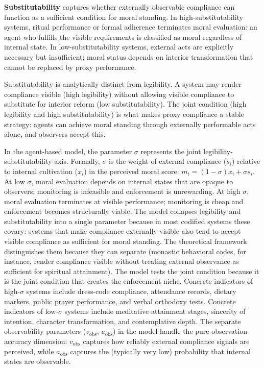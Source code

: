 \documentclass[12pt]{article}
\begin{document}
\textbf{Substitutability} captures whether externally observable compliance can function as a sufficient condition for moral standing. In high-substitutability systems, ritual performance or formal adherence terminates moral evaluation: an agent who fulfills the visible requirements is classified as moral regardless of internal state. In low-substitutability systems, external acts are explicitly necessary but insufficient; moral status depends on interior transformation that cannot be replaced by proxy performance.

Substitutability is analytically distinct from legibility. A system may render compliance visible (high legibility) without allowing visible compliance to substitute for interior reform (low substitutability). The joint condition (high legibility and high substitutability) is what makes proxy compliance a stable strategy: agents can achieve moral standing through externally performable acts alone, and observers accept this.

In the agent-based model, the parameter $\sigma$ represents the joint legibility-substitutability axis. Formally, $\sigma$ is the weight of external compliance ($s_i$) relative to internal cultivation ($x_i$) in the perceived moral score: $m_i = (1 - \sigma)x_i + \sigma s_i$. At low $\sigma$, moral evaluation depends on internal states that are opaque to observers; monitoring is infeasible and enforcement is unrewarding. At high $\sigma$, moral evaluation terminates at visible performance; monitoring is cheap and enforcement becomes structurally viable. The model collapses legibility and substitutability into a single parameter because in most codified systems these covary: systems that make compliance externally visible also tend to accept visible compliance as sufficient for moral standing. The theoretical framework distinguishes them because they can separate (monastic behavioral codes, for instance, render compliance visible without treating external observance as sufficient for spiritual attainment). The model tests the joint condition because it is the joint condition that creates the enforcement niche. Concrete indicators of high-$\sigma$ systems include dress-code compliance, attendance records, dietary markers, public prayer performance, and verbal orthodoxy tests. Concrete indicators of low-$\sigma$ systems include meditative attainment stages, sincerity of intention, character transformation, and contemplative depth. The separate observability parameters ($v_{\text{obs}}$, $a_{\text{obs}}$) in the model handle the pure observation-accuracy dimension: $v_{\text{obs}}$ captures how reliably external compliance signals are perceived, while $a_{\text{obs}}$ captures the (typically very low) probability that internal states are observable.
\end{document}

